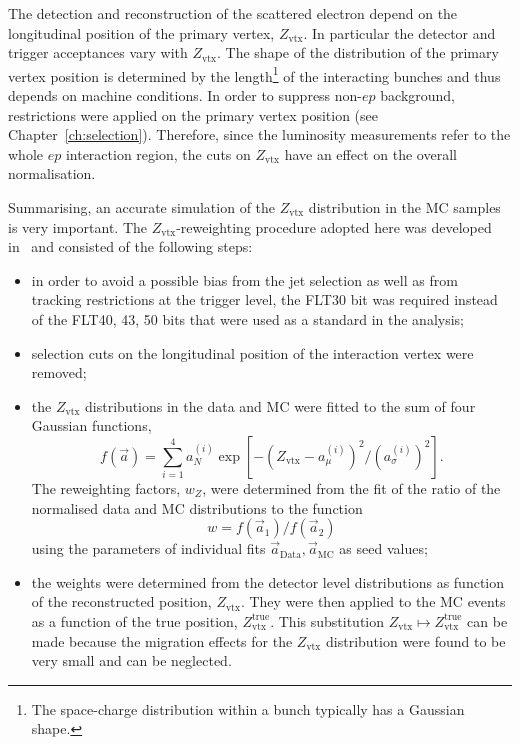 The detection and reconstruction of the scattered electron depend on the longitudinal position of the primary vertex, $Z_\text{vtx}$. In particular the detector and trigger acceptances vary with $Z_\text{vtx}$. The shape of the distribution of the primary vertex position is determined by the length\footnote{The space-charge distribution within a bunch typically has a Gaussian shape.} of the interacting bunches and thus depends on machine conditions. In order to suppress non-$ep$ background, restrictions were applied on the primary vertex position (see Chapter~\ref{ch:selection}). Therefore, since the luminosity measurements refer to the whole $ep$ interaction region, the cuts on $Z_\text{vtx}$ have an effect on the overall normalisation. 

Summarising, an accurate simulation of the $Z_\text{vtx}$ distribution in the MC samples is very important. The $Z_\text{vtx}$-reweighting procedure adopted here was developed in~\cite{thesis:behr:2010} and consisted of the following steps:
\begin{itemize}
 \item in order to avoid a possible bias from the jet selection as well as from tracking restrictions at the trigger level, the FLT30 bit was required instead of the FLT40, 43, 50 bits that were used as a standard in the analysis;
 \item selection cuts on the longitudinal position of the interaction vertex were removed;
 \item the $Z_\text{vtx}$ distributions in the data and MC were fitted to the sum of four Gaussian functions, 
\begin{equation}
f\left(\vec a\right)=\sum_{i=1}^4{a_N^{\left(i\right)}\exp{\left[-\left(Z_\text{vtx}-a_{\mu}^{\left(i\right)}\right)^2/\left(a_\sigma^{\left(i\right)}\right)^2\right]}}.
\label{eq:fourgauss}
\end{equation}
 The reweighting factors, $w_{Z}$, were determined from the fit of the ratio of the normalised data and MC distributions to the function 
\begin{equation}
w=f\left(\vec a_1\right)/f\left(\vec a_2\right)
\label{eq:zvtxweght}
\end{equation}
 using the parameters of individual fits $\vec a_{\mathrm{Data}}, \vec a_{\mathrm{MC}}$ as seed values;
 \item the weights were determined from the detector level distributions as function of the reconstructed position, $Z_\text{vtx}$. They were then applied to the MC events as a function of the true position, $Z_\text{vtx}^\text{true}$. This substitution $Z_\text{vtx} \mapsto Z_\text{vtx}^\text{true}$ can be made because the migration effects for the $Z_\text{vtx}$ distribution were found to be very small and can be neglected.
\end{itemize}


